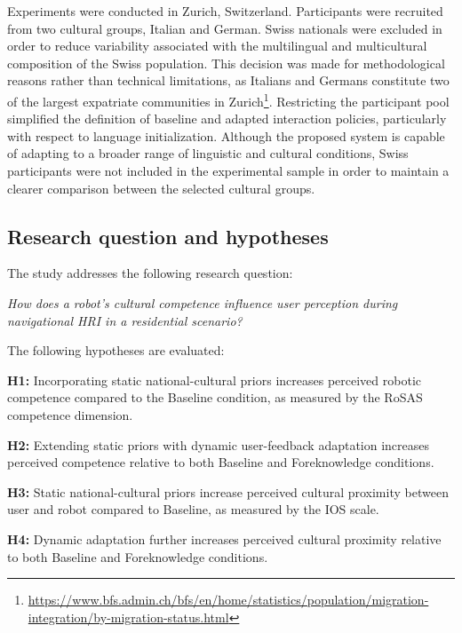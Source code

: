 Experiments were conducted in Zurich, Switzerland. Participants were recruited from two cultural groups, Italian and German. Swiss nationals were excluded in order to reduce variability associated with the multilingual and multicultural composition of the Swiss population. This decision was made for methodological reasons rather than technical limitations, as Italians and Germans constitute two of the largest expatriate communities in Zurich\footnote{\href{https://www.bfs.admin.ch/bfs/en/home/statistics/population/migration-integration/by-migration-status.html}{https://www.bfs.admin.ch/bfs/en/home/statistics/population/migration-integration/by-migration-status.html}}. Restricting the participant pool simplified the definition of baseline and adapted interaction policies, particularly with respect to language initialization. Although the proposed system is capable of adapting to a broader range of linguistic and cultural conditions, Swiss participants were not included in the experimental sample in order to maintain a clearer comparison between the selected cultural groups.

\subsection{Research question and hypotheses}
The study addresses the following research question:

\textit{How does a robot’s cultural competence influence user perception during navigational HRI in a residential scenario?}

The following hypotheses are evaluated:

\noindent \textbf{H1:} Incorporating static national-cultural priors increases perceived robotic competence compared to the Baseline condition, as measured by the RoSAS competence dimension.

\noindent \textbf{H2:} Extending static priors with dynamic user-feedback adaptation increases perceived competence relative to both Baseline and Foreknowledge conditions.

\noindent \textbf{H3:} Static national-cultural priors increase perceived cultural proximity between user and robot compared to Baseline, as measured by the IOS scale.

\noindent \textbf{H4:} Dynamic adaptation further increases perceived cultural proximity relative to both Baseline and Foreknowledge conditions.

